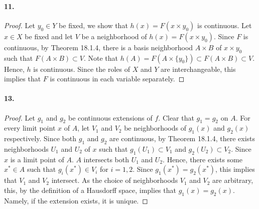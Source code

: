   \paragraph{11.}
  \begin{proof}
    Let $y_0\in Y$ be fixed, we show that $h(x)=F(x\times y_0)$ is continuous.
    Let $x\in X$ be fixed and let $V$ be a neighborhood of $h(x)=F(x\times 
    y_0)$. Since $F$ is continuous, by Theorem 18.1.4, there is a basis 
    neighborhood $A\times B$ of $x\times y_0$ such that $F(A\times B)\subset 
    V$. Note that $h(A)=F(A\times\{y_0\})\subset F(A\times B)\subset V$. 
    Hence, $h$ is continuous. Since the roles of $X$ and $Y$ are 
    interchangeable, this implies that $F$ is continuous in each variable
    separately.
  \end{proof}
  
  \paragraph{13.}
  \begin{proof}
    Let $g_1$ and $g_2$ be continuous extensions of $f$. Clear that $g_1=g_2$ 
    on $A$. For every limit point $x$ of $A$, let $V_1$ and $V_2$ be 
    neighborhoods of $g_1(x)$ and $g_2(x)$ respectively. Since both $g_1$ and 
    $g_2$ are continuous, by Theorem 18.1.4, there exists neighborhoods $U_1$ 
    and $U_2$ of $x$ such that $g_1(U_1)\subset V_1$ and $g_2(U_2)\subset V_2$. 
    Since $x$ is a limit point of $A$. $A$ intersects both $U_1$ and $U_2$. 
    Hence, there exists some $x^*\in A$ such that $g_i(x^*)\in V_i$ for 
    $i=1,2$. Since $g_1(x^*)=g_2(x^*)$, this implies that $V_1$ and $V_2$ 
    intersect. As the choice of neighborhoods $V_1$ and $V_2$ are arbitrary, 
    this, by the definition of a Hausdorff space, implies that $g_1(x)=g_2(x)$.
    Namely, if the extension exists, it is unique.
  \end{proof}






















